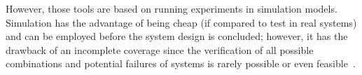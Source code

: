 \documentclass[journal]{IEEEtran}
\begin{document}
%
%
%
%
However, those tools are based on running experiments in simulation models. Simulation has the advantage of being cheap (if compared to test in real systems) and can be employed before the system design is concluded; however, it has the drawback of an incomplete coverage since the verification of all possible combinations and potential failures of systems is rarely possible or even feasible~\cite{ClarkeHV18}.
\end{document}
